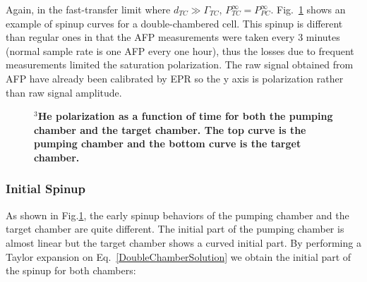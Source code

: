 Again, in the fast-transfer limit where $d_{TC}\gg \Gamma_{TC}$, $P_{TC}^{\infty}=P_{PC}^{\infty}$. Fig.~\ref{BradySpinup} shows an example of spinup curves for a double-chambered cell. This spinup is different than regular ones in that the AFP measurements were taken every 3 minutes (normal sample rate is one AFP every one hour), thus the losses due to frequent measurements limited the saturation polarization. The raw signal obtained from AFP have already been calibrated by EPR so the y axis is polarization rather than raw signal amplitude. 

\begin{figure}[H]
	\centering
	\caption{{\bf $^{3}$He polarization as a function of time for both the pumping chamber and the target chamber. The top curve is the pumping chamber and the bottom curve is the target chamber.}}
	\label{BradySpinup}
\end{figure}

\subsubsection{Initial Spinup}

As shown in Fig.\ref{BradySpinup}, the early spinup behaviors of the pumping chamber and the target chamber are quite different. The initial part of the pumping chamber is almost linear but the target chamber shows a curved initial part. By performing a Taylor expansion on Eq.~\ref{DoubleChamberSolution} we obtain the initial part of the spinup for both chambers:

